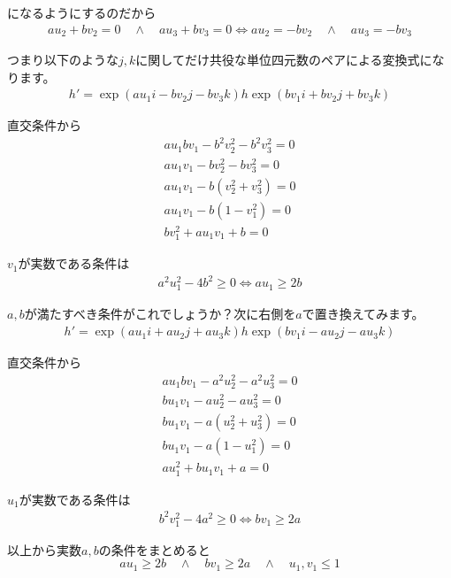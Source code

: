 \documentclass[a4paper,12pt,notitlepage]{jsreport}
\begin{document}
になるようにするのだから
\begin{gather}
  au_2+bv_2=0 \quad\land\quad au_3+bv_3=0\iff au_2=-bv_2 \quad\land\quad au_3=-bv_3
\end{gather}

つまり以下のような$j,k$に関してだけ共役な単位四元数のペアによる変換式になります。
\begin{gather}
  h'=\exp(au_1i-bv_2j-bv_3k)h\exp(bv_1i+bv_2j+bv_3k)
\end{gather}

直交条件から
\begin{equation}
  \begin{split}
    au_1bv_1-b^2v_2^2-b^2v_3^2=0\\
    au_1v_1-bv_2^2-bv_3^2=0\\
    au_1v_1-b(v_2^2+v_3^2)=0\\
    au_1v_1-b(1-v_1^2)=0\\
    bv_1^2+au_1v_1+b=0
  \end{split}
\end{equation}

$v_1$が実数である条件は
\begin{gather}
  a^2u_1^2-4b^2 \ge 0 \iff au_1 \ge 2b
\end{gather}

$a,b$が満たすべき条件がこれでしょうか？次に右側を$a$で置き換えてみます。
\begin{gather}
  h'=\exp(au_1i+au_2j+au_3k)h\exp(bv_1i-au_2j-au_3k)
\end{gather}

直交条件から
\begin{equation}
  \begin{split}
    au_1bv_1-a^2u_2^2-a^2u_3^2=0\\
    bu_1v_1-au_2^2-au_3^2=0\\
    bu_1v_1-a(u_2^2+u_3^2)=0\\
    bu_1v_1-a(1-u_1^2)=0\\
    au_1^2+bu_1v_1+a=0
  \end{split}
\end{equation}

$u_1$が実数である条件は
\begin{gather}
  b^2v_1^2-4a^2 \ge 0 \iff bv_1 \ge 2a
\end{gather}

以上から実数$a,b$の条件をまとめると
\begin{equation}
  au_1 \ge 2b \quad\land\quad bv_1 \ge 2a  \quad\land\quad u_1,v_1 \le 1
\end{equation}
\end{document}
